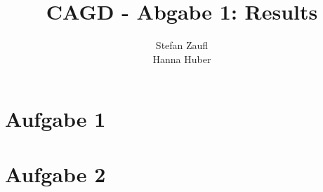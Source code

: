 \documentclass[12pt]{article}
\title{CAGD - Abgabe 1: Results}
\author{Stefan Zaufl \\ Hanna Huber}
\begin{document}
\maketitle

\section{Aufgabe 1}

\section{Aufgabe 2}
\end{document}
